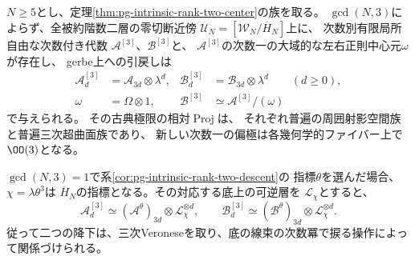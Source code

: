 \begin{corollary}[全次元での三次Veroneseの降下]
\label{cor:pg-intrinsic-third-veronese-descent}
$N\ge5$とし、定理\ref{thm:pg-intrinsic-rank-two-center}の族を取る。
$\gcd(N,3)$によらず、全被約階数二層の零切断近傍
$\mathcal U_N=[\mathcal W_N/\overline H_N]$上に、
次数別有限局所自由な次数付き代数
$\mathcal A^{[3]}$、$\mathcal B^{[3]}$と、
$\mathcal A^{[3]}$の次数一の大域的な左右正則中心元$\omega$が存在し、
gerbe上への引戻しは
\begin{equation}
 \begin{aligned}
 \mathcal A^{[3]}_d&=\mathcal A_{3d}\otimes\lambda^d,&
 \mathcal B^{[3]}_d&=\mathcal B_{3d}\otimes\lambda^d
 \qquad(d\ge0),\\
 \omega&=\Omega\otimes1,&
 \mathcal B^{[3]}&\simeq\mathcal A^{[3]}/(\omega)
 \end{aligned}
 \label{eq:pg-intrinsic-third-veronese}
\end{equation}
で与えられる。
その古典極限の相対$\operatorname{Proj}$は、
それぞれ普遍の周囲射影空間族と普遍三次超曲面族であり、
新しい次数一の偏極は各幾何学的ファイバー上で$\OO(3)$となる。

$\gcd(N,3)=1$で系\ref{cor:pg-intrinsic-rank-two-descent}の
指標$\theta$を選んだ場合、$\chi=\lambda\theta^3$は
$\overline H_N$の指標となる。その対応する底上の可逆層を
$\mathcal L_\chi$とすると、
\begin{equation}
 \mathcal A^{[3]}_d
   \simeq(\mathcal A^\theta)_{3d}\otimes\mathcal L_\chi^{\otimes d},
 \qquad
 \mathcal B^{[3]}_d
   \simeq(\mathcal B^\theta)_{3d}\otimes\mathcal L_\chi^{\otimes d}.
 \label{eq:pg-intrinsic-veronese-character-comparison}
\end{equation}
従って二つの降下は、三次Veroneseを取り、底の線束の次数冪で捩る操作によって関係づけられる。
\end{corollary}
